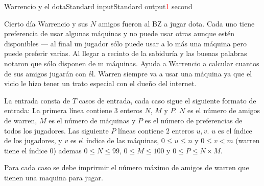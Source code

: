\begin{problem}{Warrencio y el dota}{Standard input}{Standard output}{\textcolor{red}{1} second}{}


Cierto día Warrencio y sus $N$ amigos fueron al BZ a jugar dota. Cada uno tiene preferencia de usar algunas máquinas y no puede usar otras aunque estén disponibles --- al final un jugador sólo puede usar a lo más una máquina pero puede preferir varias. Al llegar a recinto de la sabiduría y las buenas palabras notaron que sólo disponen de m máquinas. Ayuda a Warrencio a calcular cuantos de sus amigos jugarán con él. Warren siempre va a usar una máquina ya que el vicio le hizo tener un trato especial con el dueño del internet.

\InputFile
La entrada consta de $T$ casos de entrada, cada caso sigue el siguiente formato de entrada: La primera línea contiene $3$ enteros $N$, $M $ y $P$. $N$ es el número de amigos de warren, $M$ es el número de máquinas y $P$ es el número de preferencias de todos los jugadores. Las siguiente $P$ líneas contiene $2$ enteros $u,v$. $u$ es el índice de los jugadores, y $v$ es el índice de las máquinas, $0 \leq u \leq n$  y $0 \leq v<m$ (warren tiene el índice $0$) ademas $0 \leq N \leq 99$, $0 \leq M \leq 100$ y $0 \leq P \leq N\times M$.

\OutputFile
Para cada caso se debe imprirmir el número máximo de amigos de warren que tienen una maquina para jugar.  

\Example

\begin{example}
\end{example}

\end{problem}

